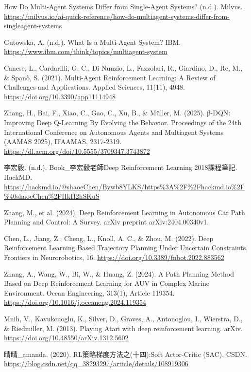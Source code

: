 \documentclass[12pt,a4paper]{article}
\begin{document}
\begin{thebibliography}{9}
How Do Multi-Agent Systems Differ from Single-Agent Systems? (n.d.). 
Milvus. 
\url{https://milvus.io/ai-quick-reference/how-do-multiagent-systems-differ-from-singleagent-systems}

Gutowska, A. (n.d.). 
What Is a Multi-Agent System? 
IBM. 
\url{https://www.ibm.com/think/topics/multiagent-system}

Canese, L., Cardarilli, G. C., Di Nunzio, L., Fazzolari, R., Giardino, D., Re, M., \& Spanò, S. (2021). 
Multi-Agent Reinforcement Learning: A Review of Challenges and Applications. 
Applied Sciences, 11(11), 4948. 
\url{https://doi.org/10.3390/app11114948}

Zhang, H., Bai, F., Xiao, C., Gao, C., Xu, B., \& Müller, M. (2025). 
β-DQN: Improving Deep Q-Learning By Evolving the Behavior. 
Proceedings of the 24th International Conference on Autonomous Agents and Multiagent Systems (AAMAS 2025), IFAAMAS, 2317-2319. 
\url{https://dl.acm.org/doi/10.5555/3709347.3743872}

李宏毅. (n.d.). 
Book\_李宏毅老師Deep Reinforcement Learning 2018課程筆記. 
HackMD. 
\url{https://hackmd.io/@shaoeChen/Bywb8YLKS/https\%3A\%2F\%2Fhackmd.io\%2F\%40shaoeChen\%2FHkH2hSKuS}

Zhang, M., et al. (2024). 
Deep Reinforcement Learning in Autonomous Car Path Planning and Control: A Survey. 
arXiv preprint arXiv:2404.00340v1.

Chen, L., Jiang, Z., Cheng, L., Knoll, A. C., \& Zhou, M. (2022). 
Deep Reinforcement Learning Based Trajectory Planning Under Uncertain Constraints. 
Frontiers in Neurorobotics, 16. 
\url{https://doi.org/10.3389/fnbot.2022.883562}

Zhang, A., Wang, W., Bi, W., \& Huang, Z. (2024). 
A Path Planning Method Based on Deep Reinforcement Learning for AUV in Complex Marine Environment. 
Ocean Engineering, 313(1), Article 119354. 
\url{https://doi.org/10.1016/j.oceaneng.2024.119354}

Mnih, V., Kavukcuoglu, K., Silver, D., Graves, A., Antonoglou, I., Wierstra, D., \& Riedmiller, M. (2013). 
Playing Atari with deep reinforcement learning. 
arXiv. 
\url{https://doi.org/10.48550/arXiv.1312.5602}

晴晴\_amanda. (2020). 
RL策略梯度方法之(十四):Soft Actor-Critic (SAC). 
CSDN. 
\url{https://blog.csdn.net/qq_38293297/article/details/108919306}


\end{thebibliography}
\end{document}
